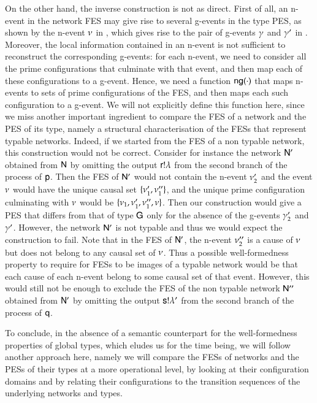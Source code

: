 On the other hand, the inverse construction is not as direct. First of
all, an n-event in the network FES may give rise to several g-events
in the type PES, as shown by the n-event $\nu$ in
, which gives rise to the pair of
g-events $\gamma$ and $\gamma'$ in
. Moreover, the local information contained
in an n-event is not sufficient to reconstruct the corresponding
g-events: for each n-event, we need to consider all the prime
configurations that culminate with that event, and then map each of
these configurations to a g-event. Hence, we need a function ${\sf
  ng}(\cdot)$ that maps n-events to sets of prime configurations of
the FES, and then maps each such configuration to a g-event. We will
not explicitly define this function here, since we miss another
important ingredient to compare the FES of a network and the PES of
its type, namely a structural characterisation of the FESs that
represent typable networks.  Indeed, if we started from the FES of a
non typable network, this construction would not be correct. Consider
for instance the network ${\sf N}'$ obtained from ${\sf N}$ 
by
omitting the output ${\sf r}! \lambda$ from the second branch of the process
of ${\sf p}$. 
Then
the FES of ${\sf N}'$ would not contain the n-event  $\nu'_2$ and the
event $\nu$ would have the unique causal set
$\{\nu'_1,\nu''_1\}$, and the unique prime configuration
culminating with $\nu$ would be
$\{\nu_1,\nu'_1,\nu''_1, \nu\}$.  Then our construction would
give a PES that differs from that of type ${\sf G}$ only for the absence of
the g-events $\gamma'_2$ and $\gamma'$. However, the network ${\sf N}'$
is not typable and thus we would expect the construction to fail.
Note that in the FES of ${\sf N}'$, the n-event  $\nu''_2$
is a cause of
$\nu$ but does not belong to any causal set of $\nu$. Thus a
possible well-formedness property to require for FESs to be images of
a typable network would be that each cause of each n-event belong to
some causal set of that event. However, this would still not be enough to
exclude the FES of the non typable network ${\sf N}''$ obtained from ${\sf N}'$ 
by omitting the
output ${\sf s}! \lambda'$ from the second branch of the process of ${\sf q}$. 


\label{wf-discussion}

To conclude, 
in the absence of a semantic counterpart for the well-formedness
properties of global types,
which eludes us for the time being, we will follow
another approach here, namely we will compare the FESs of networks and
the PESs of their types at a more operational level, by looking at their
configuration domains and by relating their configurations to the
transition sequences of the underlying networks and types.
